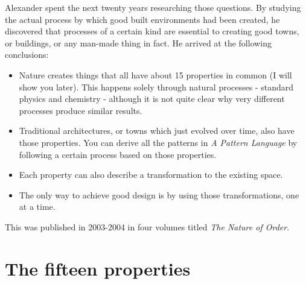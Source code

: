 Alexander spent the next twenty years researching those questions. By studying the actual process by which good built environments had been created, he discovered that processes of a certain kind are essential to creating good towns, or buildings, or any man-made thing in fact. He arrived at the following conclusions:
\begin{itemize}
 \item Nature creates things that all have about 15 properties in common (I will show you later). This happens solely through natural processes - standard physics and chemistry - although it is not quite clear why very different processes produce similar results.
 \item Traditional architectures, or towns which just evolved over time, also have those properties. You can derive all the patterns in \textit{A Pattern Language} by following a certain process based on those properties.
 \item Each property can also describe a transformation to the existing space.
 \item The only way to achieve good design is by using those transformations, one at a time.
\end{itemize}
This was published in 2003-2004 in four volumes titled \textit{The Nature of Order}.

\section*{The fifteen properties}

